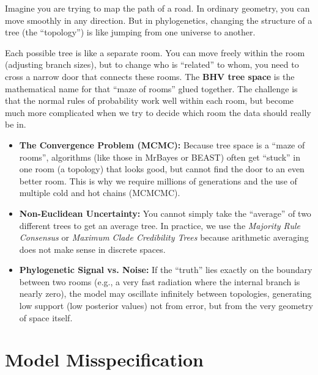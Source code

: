 \begin{tcolorbox}[
    colback=green!5!white,
    colframe=green!50!black,
    title=\textbf{Explaining It Simply: The Problem with Trees},
    arc=2mm, %
    boxrule=0.5pt
]
Imagine you are trying to map the path of a road. In ordinary geometry, you can move smoothly in any direction. But in phylogenetics, changing the structure of a tree (the ``topology'') is like jumping from one universe to another.

Each possible tree is like a separate room. You can move freely within the room (adjusting branch sizes), but to change who is ``related'' to whom, you need to cross a narrow door that connects these rooms. The \textbf{BHV tree space} is the mathematical name for that ``maze of rooms'' glued together. The challenge is that the normal rules of probability work well within each room, but become much more complicated when we try to decide which room the data should really be in.
\end{tcolorbox}

\begin{tcolorbox}[
    colback=red!5!white,
    colframe=red!75!black,
    title=\textbf{Practical Consequences for Research},
    arc=2mm
]
\begin{itemize}
    \item \textbf{The Convergence Problem (MCMC):} Because tree space is a ``maze of rooms'', algorithms (like those in MrBayes or BEAST) often get ``stuck'' in one room (a topology) that looks good, but cannot find the door to an even better room. This is why we require millions of generations and the use of multiple cold and hot chains (MCMCMC).
    \item \textbf{Non-Euclidean Uncertainty:} You cannot simply take the ``average'' of two different trees to get an average tree. In practice, we use the \textit{Majority Rule Consensus} or \textit{Maximum Clade Credibility Trees} because arithmetic averaging does not make sense in discrete spaces.
    \item \textbf{Phylogenetic Signal vs. Noise:} If the ``truth'' lies exactly on the boundary between two rooms (e.g., a very fast radiation where the internal branch is nearly zero), the model may oscillate infinitely between topologies, generating low support (low posterior values) not from error, but from the very geometry of space itself.
\end{itemize}
\end{tcolorbox}

\section{Model Misspecification}

